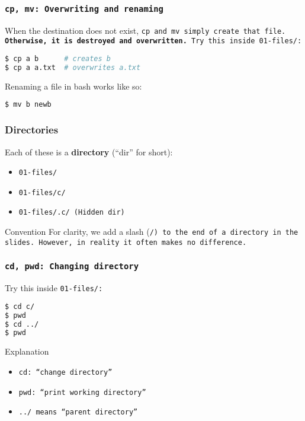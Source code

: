 \begin{frame}[fragile]
\frametitle{\tt{cp, mv}: Overwriting and renaming}
When the destination does not exist, \tt{cp} and \tt{mv} simply create
that file. \textbf{Otherwise, it is destroyed and overwritten.}
\newline \newline
Try this inside \tt{01-files/}:
\begin{lstlisting}[language=bash]
$ cp a b      # creates b
$ cp a a.txt  # overwrites a.txt
\end{lstlisting}

Renaming a file in bash works like so:
\begin{lstlisting}[language=bash]
$ mv b newb
\end{lstlisting}
\end{frame}

\begin{frame}
\frametitle{Directories}
Each of these is a \textbf{directory} (``dir'' for short):
\begin{itemize}
    \item \tt{01-files/}
    \item \tt{01-files/c/}
    \item \tt{01-files/.c/} (Hidden dir)
\end{itemize}

\begin{block}{Convention}
    For clarity, we add a slash (\tt{/}) to the end of a directory in the
    slides. However, in reality it often makes no difference.
\end{block}
\end{frame}

\begin{frame}[fragile]
\frametitle{\tt{cd, pwd}: Changing directory}
Try this inside \tt{01-files/}:
\begin{lstlisting}[language=bash]
$ cd c/
$ pwd
$ cd ../
$ pwd
\end{lstlisting}
\begin{block}{Explanation}
    \begin{itemize}
        \item \tt{cd}: ``change directory''
        \item \tt{pwd}: ``print working directory''
        \item \tt{../} means ``parent directory''
    \end{itemize}
\end{block}
\end{frame}

